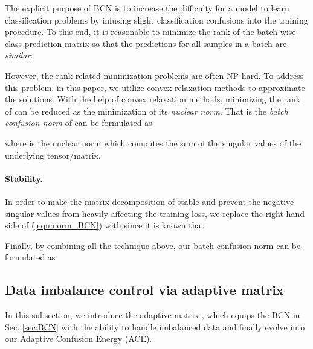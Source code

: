 \documentclass{article}
\begin{document}
The explicit purpose of BCN is to increase the difficulty for a model to learn classification problems by infusing slight classification confusions into the training procedure. To this end, it is reasonable to minimize the rank of the batch-wise class prediction matrix  so that the predictions for all samples in a batch are {\em similar}:
\begin{linenomath}

\end{linenomath}
However, the rank-related minimization problems are often NP-hard. To address this problem, in this paper, we utilize convex relaxation methods to approximate the solutions. With the help of convex relaxation methods, minimizing the rank of  can be reduced as the minimization of its {\em nuclear norm}. That is the {\em batch confusion norm} of  can be formulated as
\begin{linenomath}

\end{linenomath}
where  is the nuclear norm which computes the sum of the singular values of the underlying tensor/matrix.

\paragraph{Stability.} In order to make the matrix decomposition of  stable and prevent the negative singular values from heavily affecting the training loss, we replace the right-hand side of (\ref{eqn:norm_BCN}) with  since it is known that
\begin{linenomath}
 
\end{linenomath}

Finally, by combining all the technique above, our batch confusion norm can be formulated as 
 

\subsection{Data imbalance control via adaptive matrix }
\label{sec:MA}
In this subsection, we introduce the adaptive matrix , which equips the BCN in Sec. \ref{sec:BCN} with the ability to handle imbalanced data and finally evolve into our Adaptive Confusion Energy (ACE). 
\end{document}
